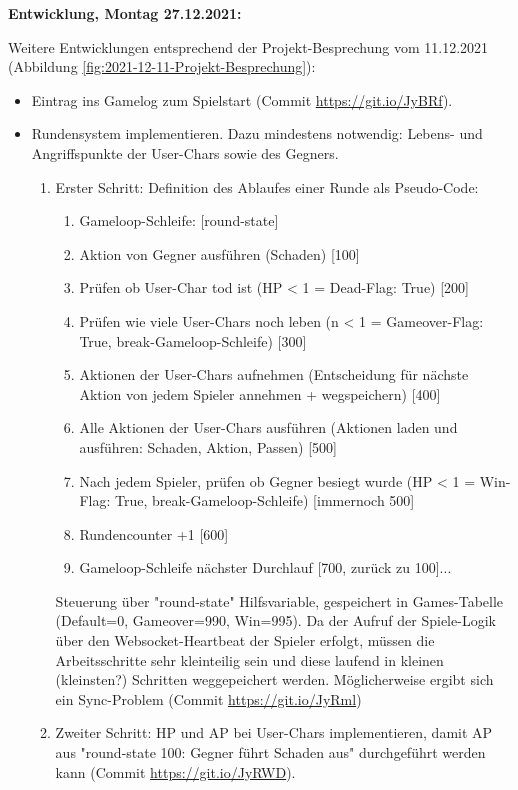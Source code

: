\textbf{Entwicklung, Montag 27.12.2021:} \label{ref-runden-impl}

Weitere Entwicklungen entsprechend der Projekt-Besprechung vom 11.12.2021 (Abbildung \ref{fig:2021-12-11-Projekt-Besprechung}):

\begin{itemize}
    \item Eintrag ins Gamelog zum Spielstart (Commit \url{https://git.io/JyBRf}).
    \item Rundensystem implementieren. Dazu mindestens notwendig: Lebens- und Angriffspunkte der User-Chars sowie des Gegners. 
    \begin{enumerate}
        \item Erster Schritt: Definition des Ablaufes einer Runde als Pseudo-Code: 
            \begin{enumerate}
                \item Gameloop-Schleife: [round-state]
                \item Aktion von Gegner ausführen (Schaden) [100]
                \item Prüfen ob User-Char tod ist (HP < 1 = Dead-Flag: True) [200]
                \item Prüfen wie viele User-Chars noch leben (n < 1 = Gameover-Flag: True, break-Gameloop-Schleife) [300]
                \item Aktionen der User-Chars aufnehmen (Entscheidung für nächste Aktion von jedem Spieler annehmen + wegspeichern) [400]
                \item Alle Aktionen der User-Chars ausführen (Aktionen laden und ausführen: Schaden, Aktion, Passen) [500]
                \item Nach jedem Spieler, prüfen ob Gegner besiegt wurde (HP < 1 = Win-Flag: True, break-Gameloop-Schleife) [immernoch 500]
                \item Rundencounter +1 [600]
                \item Gameloop-Schleife nächster Durchlauf [700, zurück zu 100]...
            \end{enumerate}
    Steuerung über "round-state" Hilfsvariable, gespeichert in Games-Tabelle (Default=0, Gameover=990, Win=995). Da der Aufruf der Spiele-Logik über den Websocket-Heartbeat der Spieler erfolgt, müssen die Arbeitsschritte sehr kleinteilig sein und diese laufend in kleinen (kleinsten?) Schritten weggepeichert werden. Möglicherweise ergibt sich ein Sync-Problem (Commit \url{https://git.io/JyRml})
    \item Zweiter Schritt: HP und AP bei User-Chars implementieren, damit AP aus "round-state 100: Gegner führt Schaden aus" durchgeführt werden kann (Commit \url{https://git.io/JyRWD}).  
    \end{enumerate}
\end{itemize}


